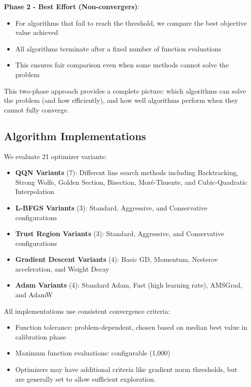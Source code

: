 \textbf{Phase 2 - Best Effort (Non-convergers)}:

\begin{itemize}
\tightlist
\item
  For algorithms that fail to reach the threshold, we compare the best objective value achieved
\item
  All algorithms terminate after a fixed number of function evaluations
\item
  This ensures fair comparison even when some methods cannot solve the problem
\end{itemize}

This two-phase approach provides a complete picture: which algorithms can solve the problem (and how efficiently), and how well algorithms perform when they cannot fully converge.

\hypertarget{algorithm-implementations}{%
\subsection{Algorithm Implementations}\label{algorithm-implementations}}

We evaluate 21 optimizer variants:

\begin{itemize}
\tightlist
\item
  \textbf{QQN Variants} (7): Different line search methods including Backtracking, Strong Wolfe, Golden Section, Bisection, Moré-Thuente, and Cubic-Quadratic Interpolation
\item
  \textbf{L-BFGS Variants} (3): Standard, Aggressive, and Conservative configurations
\item
  \textbf{Trust Region Variants} (3): Standard, Aggressive, and Conservative configurations
\item
  \textbf{Gradient Descent Variants} (4): Basic GD, Momentum, Nesterov acceleration, and Weight Decay
\item
  \textbf{Adam Variants} (4): Standard Adam, Fast (high learning rate), AMSGrad, and AdamW
\end{itemize}

All implementations use consistent convergence criteria:

\begin{itemize}
\tightlist
\item
  Function tolerance: problem-dependent, chosen based on median best value in calibration phase
\item
  Maximum function evaluations: configurable (1,000)
\item
  Optimizers may have additional criteria like gradient norm thresholds, but are generally set to allow sufficient exploration.
\end{itemize}

